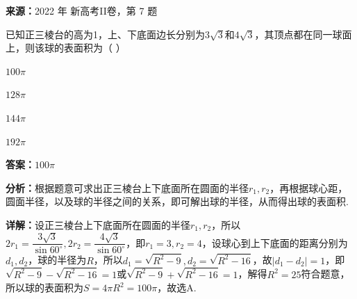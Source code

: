 \begin{question}[points=5]
\textbf{来源：}2022 年 新高考II卷，第 7 题\par
已知正三棱台的高为1，上、下底面边长分别为$3\sqrt{3}$和$4\sqrt{3}$，其顶点都在同一球面上，则该球的表面积为（ ）
\begin{choices}
  \item $100\pi$
  \item $128\pi$
  \item $144\pi$
  \item $192\pi$
\end{choices}
\begin{solution}
\textbf{答案：}$100\pi$

\textbf{分析：}根据题意可求出正三棱台上下底面所在圆面的半径$r_1,r_2$，再根据球心距，圆面半径，以及球的半径之间的关系，即可解出球的半径，从而得出球的表面积.

\textbf{详解：}设正三棱台上下底面所在圆面的半径$r_1,r_2$，所以$2r_1=\dfrac{3\sqrt{3}}{\sin60^\circ},2r_2=\dfrac{4\sqrt{3}}{\sin60^\circ}$，即$r_1=3,r_2=4$，设球心到上下底面的距离分别为$d_1,d_2$，球的半径为$R$，所以$d_1=\sqrt{R^2-9},d_2=\sqrt{R^2-16}$，故$|d_1-d_2|=1$，即$\sqrt{R^2-9}-\sqrt{R^2-16}=1$或$\sqrt{R^2-9}+\sqrt{R^2-16}=1$，解得$R^2=25$符合题意，所以球的表面积为$S=4\pi R^2=100\pi$，故选A.
\end{solution}
\end{question}

